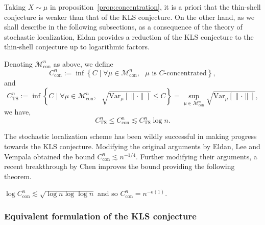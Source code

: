 Taking \(X \sim \mu\) in proposition~\ref{prop:concentration}, it is a priori that the thin-shell conjecture is 
weaker than that of the KLS conjecture. On the other hand, as we shall describe in the following subsections, 
as a consequence of the theory of stochastic localization, Eldan \cite{Eldan_2013} provides a reduction 
of the KLS conjecture to the thin-shell conjecture up to logarithmic factors. 

\begin{theorem}\label{thm:KLS_to_TS}
  Denoting \(\mathscr{M}^n_{\text{con}}\) as above, we define 
  \[C^n_{\text{con}} := \inf \left\{C \mid \text{\(\forall \mu \in \mathscr{M}^n_{\text{con}},\) 
    \(\mu\) is \(C\)-concentrated}\right\},\]
  and 
  \[C^n_{\text{TS}} := \inf \left\{C \mid \text{\(\forall \mu \in \mathscr{M}^n_{\text{con}},\) 
      \(\sqrt{\text{Var}_\mu[\|\cdot\|]} \le C\)}\right\}
      = \sup_{\mu \in \mathscr{M}^n_{\text{con}}} \sqrt{\text{Var}_\mu[\|\cdot\|]},\]
  we have,
  \[C^n_{\text{TS}} \le C^n_{\text{con}} \lesssim C^n_{\text{TS}} \log n.\]
\end{theorem}


The stochastic localization scheme has been wildly successful in making progress towards the KLS conjecture. 
Modifying the original arguments by Eldan, Lee and Vempala \cite{Lee_2016} obtained the bound 
\(C_{\text{con}}^n \lesssim n^{-1 / 4}\). Further modifying their arguments, a recent breakthrough by 
Chen \cite{Chen_2020} improves the bound providing the following theorem. 

\begin{theorem}
  \(\log C_{\text{con}}^n \lesssim \sqrt{\log n \log \log n}\) and so \(C_{\text{con}}^n = n^{-o(1)}\).
\end{theorem}


\subsubsection{Equivalent formulation of the KLS conjecture}

